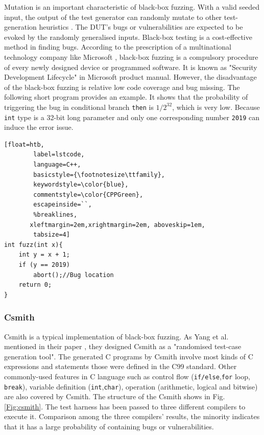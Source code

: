 Mutation is an important characteristic of black-box fuzzing. With a valid seeded input, the output of the test generator can randomly mutate to other test-generation heuristics \cite{bounimova2013billions}. The DUT's bugs or vulnerabilities are expected to be evoked by the randomly generalised inputs. Black-box testing is a cost-effective method in finding bugs. According to the prescription of a multinational technology company like Microsoft \cite{bounimova2013billions}, black-box fuzzing is a compulsory procedure of every newly designed device or programmed software. It is known as "Security Development Lifecycle" \cite{howard2006security} in Microsoft product manual. However, the disadvantage of the black-box fuzzing is relative low code coverage and bug missing. The following short program provides an example. It shows that the probability of triggering the bug in conditional branch \texttt{then} is $1/2^{32}$, which is very low. Because \texttt{int} type is a 32-bit long parameter and only one corresponding number \texttt{2019} can induce the error issue.
\begin{lstlisting}[float=htb,
        label=lstcode,
        language=C++,
        basicstyle={\footnotesize\ttfamily},
        keywordstyle=\color{blue}, 
        commentstyle=\color{CPPGreen},
        escapeinside=``,
        %breaklines,
       xleftmargin=2em,xrightmargin=2em, aboveskip=1em,
        tabsize=4]
int fuzz(int x){
    int y = x + 1;
    if (y == 2019) 
        abort();//Bug location
    return 0;
}
\end{lstlisting}
\subsubsection{Csmith}
Csmith is a typical implementation of black-box fuzzing. As Yang et al. mentioned in their paper \cite{Yang:2011:FUB:1993316.1993532}, they designed Csmith as a "randomised test-case generation tool". The generated C programs by Csmith involve most kinds of C expressions and statements those were defined in the C99 standard. Other commonly-used features in C language such as control flow (\texttt{if/else},\texttt{for} loop, \texttt{break}), variable definition (\texttt{int},\texttt{char}), operation (arithmetic, logical and bitwise) are also covered by Csmith. The structure of the Csmith shows in Fig. \ref{Fig:csmith}. The test harness has been passed to three different compilers to execute it. Comparison among the three compilers' results, the minority indicates that it has a large probability of containing bugs or vulnerabilities. 

